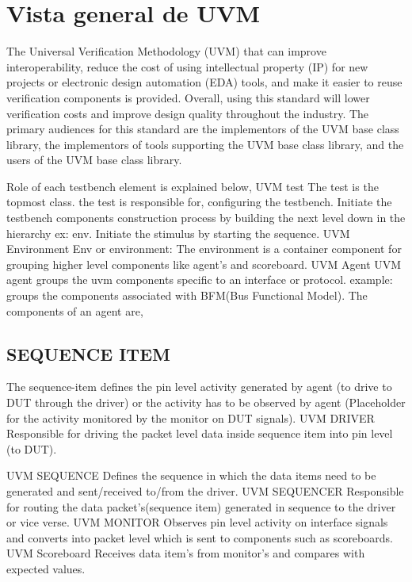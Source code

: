 \documentclass[a4paper]{article}
\begin{document}
\section{Vista general de UVM}

The Universal Verification Methodology (UVM) that can improve interoperability, reduce the cost of using intellectual property (IP) for new projects or electronic design automation (EDA) tools, and make it easier to reuse verification components is provided. Overall, using this standard will lower verification costs and improve design quality throughout the industry. The primary audiences for this standard are the implementors of the UVM base class library, the implementors of tools supporting the UVM base class library, and the users of the UVM base class library.

Role of each testbench element is explained below, UVM test The test is the topmost class. the test is responsible for, configuring the testbench. Initiate the testbench components construction process by building the next level down in the hierarchy ex: env.
Initiate the stimulus by starting the sequence.
UVM Environment
Env or environment: The environment is a container component for grouping higher level components like agent’s and scoreboard.
UVM Agent
UVM agent groups the uvm components specific to an interface or protocol.
example: groups the components associated with BFM(Bus Functional Model).
The components of an agent are,

\subsection{SEQUENCE ITEM}

The sequence-item defines the pin level activity generated by agent (to drive to DUT through the driver) or the activity has to be observed by agent (Placeholder for the activity monitored by the monitor on DUT signals).
UVM DRIVER
Responsible for driving the packet level data inside sequence item into pin level (to DUT).

UVM SEQUENCE
Defines the sequence in which the data items need to be generated and sent/received to/from the driver.
UVM SEQUENCER
Responsible for routing the data packet’s(sequence item) generated in sequence to the driver or vice verse.
UVM MONITOR
Observes pin level activity on interface signals and converts into packet level which is sent to components such as scoreboards.
UVM Scoreboard
Receives data item’s from monitor’s and compares with expected values.
\end{document}
